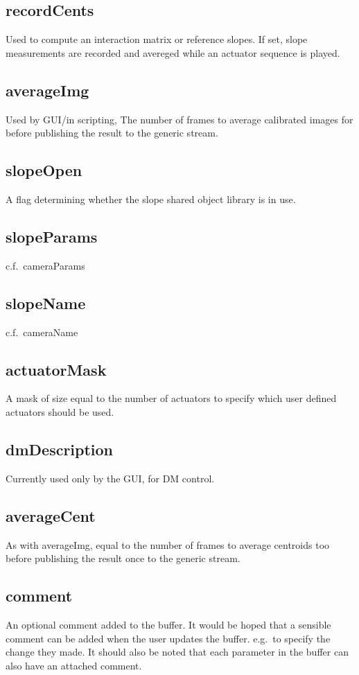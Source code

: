 \documentclass[a4,10pt]{article}
\begin{document}
\subsection{recordCents}
Used to compute an interaction matrix or reference slopes.  If set,
slope measurements are recorded and avereged while an actuator
sequence is played.


\subsection{averageImg}
Used by GUI/in scripting, The number of frames to average calibrated
images for before publishing the result to the generic stream.

\subsection{slopeOpen}
A flag determining whether the slope
shared object library is in use.

\subsection{slopeParams}
c.f.\ cameraParams

\subsection{slopeName}
c.f.\ cameraName

\subsection{actuatorMask}
A mask of size equal to the number of actuators to specify which user
defined actuators should be used.

\subsection{dmDescription}
Currently used only by the GUI, for DM control.

\subsection{averageCent}
As with averageImg, equal to the number of frames to average centroids
too before publishing the result once to the generic stream.


\subsection{comment}
An optional comment added to the buffer.  It would be hoped that
a sensible comment can be added when the user updates the buffer.
e.g.\ to specify the change they made.  It should also be noted that
each parameter in the buffer can also have an attached comment.
\end{document}
